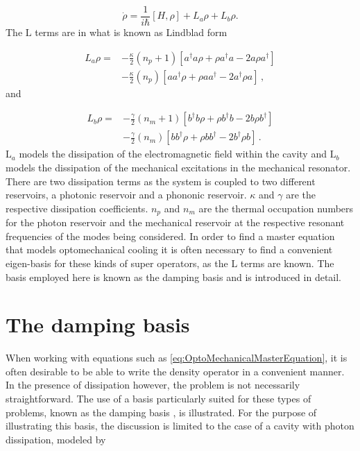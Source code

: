 \documentclass[12pt]{article}
\begin{document}
\begin{equation} \label{eq:OptoMechanicalMasterEquation}
\dot{\rho} = \frac{1}{i\hbar}[H,\rho] +L_a\rho + L_b \rho.
\end{equation} The $\mathrm{L}$ terms are in what is known as Lindblad form 

\begin{align}
L_a \rho =& - \frac{\kappa}{2}(n_p + 1)[a^\dagger a\rho + \rho a^\dagger a -2a\rho a^\dagger]  \\
 &- \frac{\kappa}{2}(n_p)[ aa^\dagger\rho + \rho  aa^\dagger -2a^\dagger\rho a]\, ,\nonumber
\end{align} and

\begin{align}
L_b \rho =& - \frac{\gamma}{2}(n_m + 1)[b^\dagger b\rho + \rho b^\dagger b -2b\rho b^\dagger]  \\
 &- \frac{\gamma}{2}(n_m)[ bb^\dagger\rho + \rho  bb^\dagger -2b^\dagger\rho b]\, .\nonumber
\end{align} $\mathrm{L}_a$ models the dissipation of the electromagnetic field within the cavity and $\mathrm{L}_b$ models the dissipation of the mechanical excitations in the mechanical resonator. There are two dissipation terms as the system is coupled to two different reservoirs, a photonic reservoir and a phononic reservoir. $\kappa$ and $\gamma$ are the respective dissipation coefficients. $n_p$ and $n_m$ are the thermal occupation numbers for the photon reservoir and the mechanical reservoir at the respective resonant frequencies of the modes being considered. In order to find a master equation that models optomechanical cooling it is often necessary to find a convenient eigen-basis for these kinds of super operators, as the $\mathrm{L}$ terms are known. The basis employed here is known as the damping basis and is introduced in detail. 

\section{The damping basis}

When working with equations such as \ref{eq:OptoMechanicalMasterEquation}, it is often desirable to be able to write the density operator in a convenient manner.  In the presence of dissipation however, the problem is not necessarily straightforward. The use of a basis particularly suited for these types of problems, known as the damping basis \cite{BriegelDampingBasis1993}, is illustrated. For the purpose of illustrating this basis, the discussion is limited to the case of a cavity with photon dissipation, modeled by
\end{document}
